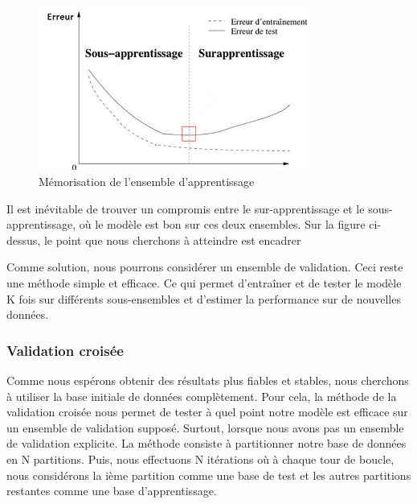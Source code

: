 \documentclass{article}
\begin{document}
\begin{figure}[H]
  \begin{center}
    \includegraphics[width=0.8\textwidth]{apprentissage.png}
    \caption{Mémorisation de l'ensemble d'apprentissage}
  \end{center}
\end{figure}
Il est inévitable de trouver un compromis entre le sur-apprentissage et le sous-apprentissage, où le modèle est bon sur ces deux ensembles. Sur la figure ci-dessus, le point que nous cherchons à atteindre est encadrer 

Comme solution, nous pourrons considérer un ensemble de validation. Ceci reste une méthode simple et efficace. Ce qui permet d'entraîner et de tester le modèle K fois sur différents sous-ensembles et d'estimer la performance sur de nouvelles données.


\subsubsection{Validation croisée}


\quad Comme nous espérons obtenir des résultats plus fiables et stables, nous cherchons à utiliser la base initiale de données complètement. Pour cela, la méthode de la validation croisée nous permet de tester à quel point notre modèle est efficace sur un ensemble de validation supposé. Surtout, lorsque nous avons pas un ensemble de validation explicite. La méthode consiste à partitionner notre base de données en N partitions. Puis, nous effectuons N itérations où à chaque tour de boucle, nous considérons la ième partition comme une base de test et les autres partitions restantes comme une base d'apprentissage.
\end{document}
